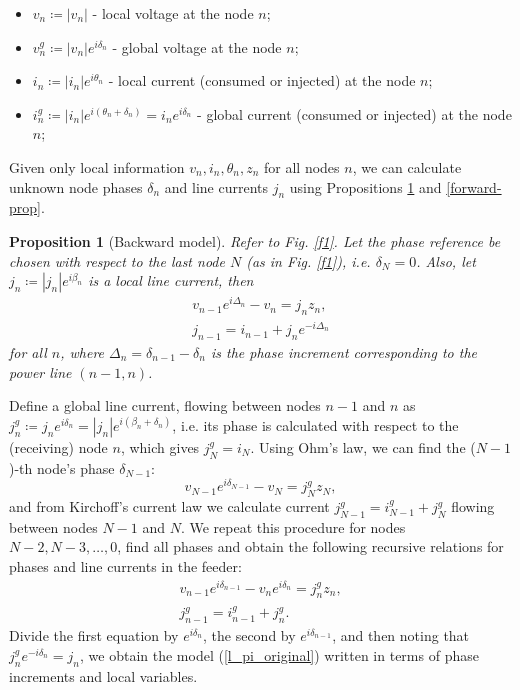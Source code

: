 \documentclass[journal,10pt,onecolumn,draftclsnofoot,]{IEEEtran}
\makeatletter
\theoremstyle{plain}
\newtheorem{proposition}{Proposition}
\theoremstyle{definition}
\theoremstyle{remark}
\renewenvironment{proof}[1][\proofname]{\par
  \pushQED{\qed}%
  \normalfont \topsep6\p@\@plus6\p@\relax
  \list{}{%
    \settowidth{\leftmargin}{\itshape\proofname:\hskip\labelsep}%
    \setlength{\labelwidth}{0pt}%
    \setlength{\itemindent}{-\leftmargin}%
  }%
  \item[\hskip\labelsep\itshape#1\@addpunct{:}]\ignorespaces
}{%
  \popQED\endlist\@endpefalse
}
\makeatother
\begin{document}
\begin{itemize}
  \item $v_n \coloneqq |v_n|$ - local voltage at the node $n$;
  \item $v_n^g \coloneqq |v_n|e^{i\delta_n}$ - global voltage at the node $n$;
  \item $i_{n} \coloneqq |i_{n}|e^{i\theta_n}$ - local current (consumed or injected) at the node $n$;
  \item $i^g_{n} \coloneqq |i_{n}|e^{i(\theta_n + \delta_n)} = i_{n}e^{i\delta_n}$ - global current (consumed or injected) at the node $n$;
\end{itemize}

Given only local information $v_n, i_n, \theta_n, z_n$ for all nodes $n$, we can calculate unknown node phases $\delta_n$ and line currents $j_n$ using Propositions \ref{backward_prop} and \ref{forward-prop}. 

\begin{proposition}[Backward model]
  Refer to Fig. \ref{f1}. Let the phase reference be chosen with respect to the last node $N$ (as in Fig. \ref{f1}), i.e. $\delta_N = 0$. Also, let $j_{n} \coloneqq |j_{n}|e^{i\beta_n}$ is a local line current, then
  \begin{equation}
    \begin{split}
    v_{n-1}e^{i\Delta_{n}} - v_{n} = j_{n}z_{n}, \\
    j_{n-1} = i_{n-1} + j_{n}e^{-i\Delta_{n}}
    \end{split}
    \label{l_pi_original}
  \end{equation}
  for all $n$, where $\Delta_{n} = \delta_{n-1} - \delta_{n}$ is the phase increment corresponding to the power line $(n-1, n)$. 
  \label{backward_prop}
\end{proposition}

\begin{proof}
Define a global line current, flowing between nodes $n-1$ and $n$ as $j^{g}_{n} \coloneqq j_{n}e^{i\delta_n} = |j_{n}|e^{i(\beta_n + \delta_n)}$, i.e. its phase is calculated with respect to the (receiving) node $n$, which gives $j^{g}_{N} = i_N$. Using Ohm's law, we can find the ($N-1$)-th node's phase $\delta_{N-1}$: 
  $$v_{N-1}e^{i\delta_{N-1}} - v_{N} = j^{g}_{N}z_{N},$$
and from Kirchoff's current law we calculate current $j^{g}_{N-1} = i^g_{N-1} + j^{g}_{N}$ flowing between nodes $N-1$ and $N$.
We repeat this procedure for nodes $N-2, N-3, \ldots, 0$, find all phases and obtain the following recursive relations for phases and line currents in the feeder:
\begin{equation*}
  \begin{split}
  v_{n-1}e^{i\delta_{n-1}} - v_{n}e^{i\delta_n} = j^{g}_{n}z_{n}, \\
  j^{g}_{n-1} = i^g_{n-1} + j^{g}_{n}.
  \end{split}
\end{equation*}
Divide the first equation by $e^{i\delta_{n}}$, the second by $e^{i\delta_{n-1}}$, and then noting that $j^{g}_n e^{-i\delta_n} = j_n$, we obtain the model (\ref{l_pi_original}) written in terms of phase increments and local variables.
\end{proof}
\end{document}
